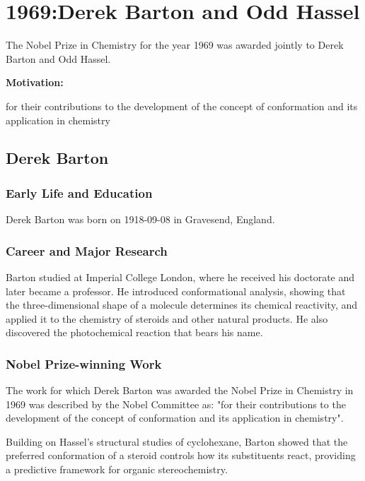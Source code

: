\chapter{1969:Derek Barton and Odd Hassel}

\label{chap:chemistry1969}

The Nobel Prize in Chemistry for the year 1969 was awarded jointly to Derek Barton and Odd Hassel.

\textbf{Motivation:}

for their contributions to the development of the concept of conformation and its application in chemistry

\section{Derek Barton}

\subsection*{Early Life and Education}

Derek Barton was born on 1918-09-08 in Gravesend, England.

\subsection*{Career and Major Research}

Barton studied at Imperial College London, where he received his doctorate and later became a professor. He introduced conformational analysis, showing that the three-dimensional shape of a molecule determines its chemical reactivity, and applied it to the chemistry of steroids and other natural products. He also discovered the photochemical reaction that bears his name.

\subsection*{Nobel Prize-winning Work}

The work for which Derek Barton was awarded the Nobel Prize in Chemistry in 1969 was described by the Nobel Committee as: "for their contributions to the development of the concept of conformation and its application in chemistry".

Building on Hassel's structural studies of cyclohexane, Barton showed that the preferred conformation of a steroid controls how its substituents react, providing a predictive framework for organic stereochemistry.

